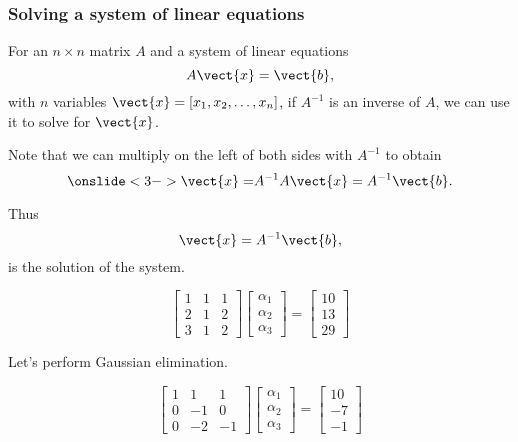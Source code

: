\begin{frame}
  \frametitle{Solving a system of linear equations}
  For an $n\times n$ matrix $A$ and a system of linear equations
  \[
  A\vect{x} =\vect{b},
  \]
  with $n$ variables $\vect{x}=[x_1,x_2,\ldots,x_n]$,
  if $A^{-1}$ is an inverse of $A$, we can use it to solve for
  $\vect{x}$.

  \pause Note that we can multiply on the left of both sides with
  $A^{-1}$ to obtain
  \[
  \onslide<3->{\vect{x} =} A^{-1}A\vect{x} = A^{-1}\vect{b}.
  \]

  \pause
  \pause
  Thus
  \[
  \vect{x} = A^{-1}\vect{b},
  \]
  is the solution of the system.
\end{frame}

\begin{frame}
    
    \[
    \begin{bmatrix}
      1 & 1 & 1 \\
      2 & 1 & 2 \\
      3 & 1 & 2
    \end{bmatrix}
    \begin{bmatrix}
      \alpha_1 \\
      \alpha_2 \\
      \alpha_3
    \end{bmatrix}
    =
    \begin{bmatrix}
      10 \\
      13 \\
      29
    \end{bmatrix}
    \]

    Let's perform Gaussian elimination.
    
    \pause

    \[
    \begin{bmatrix}
      1 & 1 & 1 \\
      0 & -1 & 0 \\
      0 & -2 & -1
    \end{bmatrix}
    \begin{bmatrix}
      \alpha_1 \\
      \alpha_2 \\
      \alpha_3
    \end{bmatrix}
    =
    \begin{bmatrix}
      10 \\
      -7 \\
      -1
    \end{bmatrix}
    \]
    
    \pause


\end{frame}
